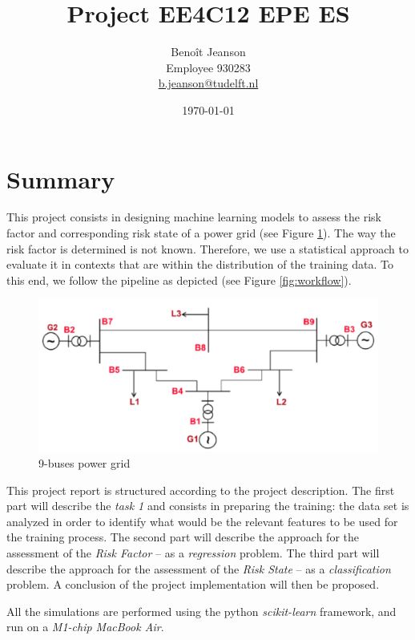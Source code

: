 \documentclass[11pt]{article}
\title{Project EE4C12 EPE ES}
\author{Benoît Jeanson \\ Employee 930283 \\ \href{mailto:b.jeanson@tudelft.nl}{b.jeanson@tudelft.nl}}
\date{\today}
\def\rf{\emph{Risk Factor }}
\begin{document}
\maketitle
\pagebreak



\section{Summary}
    This project consists in designing machine learning models to assess the risk factor and corresponding risk state of a power grid (see Figure \ref{fig:grid}). The way the risk factor is determined is not known. Therefore, we use a statistical approach to evaluate it in contexts that are within the distribution of the training data. To this end, we follow the pipeline as depicted (see Figure \ref{fig:workflow}).
   
    \begin{figure}
        \centering
        \includegraphics[scale=0.08]{images/IEEE9-grid.jpg}
        \caption{\label{fig:grid}9-buses power grid}
    \end{figure}

    This project report is structured according to the project description. The first part will describe the \emph{task 1} and consists in preparing the training: the data set is analyzed in order to identify what would be the relevant features to be used for the training process. The second part will describe the approach for the assessment of the \rf -- as a \emph{regression} problem. The third part will describe the approach for the assessment of the \emph{Risk State} -- as a \emph{classification} problem. A conclusion of the project implementation will then be proposed.

    All the simulations are performed using the python \emph{scikit-learn} framework, and run on a \emph{M1-chip MacBook Air}.
\end{document}

